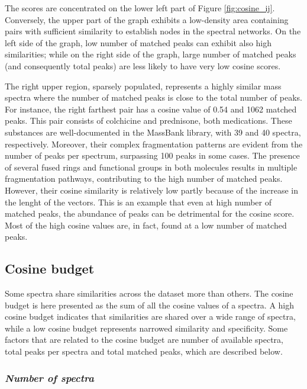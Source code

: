 The scores are concentrated on the lower left part of Figure \ref{fig:cosine_ij}. Conversely, the upper part of the graph exhibits a low-density area containing pairs with sufficient similarity to establish nodes in the spectral networks. On the left side of the graph, low number of matched peaks can exhibit also high similarities; while on the right side of the graph, large number of matched peaks (and consequently total peaks) are less likely to have very low cosine scores. 

The right upper region, sparsely populated, represents a highly similar mass spectra where the number of matched peaks is close to the total number of peaks. For instance, the right farthest pair has a cosine value of 0.54 and 1062 matched peaks. This pair consists of colchicine and prednisone, both medications. These substances are well-documented in the MassBank library, with 39 and 40 spectra, respectively. Moreover, their complex fragmentation patterns are evident from the number of peaks per spectrum, surpassing 100 peaks in some cases. The presence of several fused rings and functional groups in both molecules results in multiple fragmentation pathways, contributing to the high number of matched peaks. However, their cosine similarity is relatively low partly because of the increase in the lenght of the vectors. This is an example that even at high number of matched peaks, the abundance of peaks can be detrimental for the cosine score. Most of the high cosine values are, in fact, found at a low number of matched peaks.



\subsection*{Cosine budget}

Some spectra share similarities across the dataset more than others. The cosine budget is here presented as the sum of all the cosine values of a spectra. A high cosine budget indicates that similarities are shared over a wide range of spectra, while a low cosine budget represents narrowed similarity and specificity. Some factors that are related to the cosine budget are number of available spectra, total peaks per spectra and total matched peaks, which are described below.

\subsubsection*{\textit{Number of spectra}}

